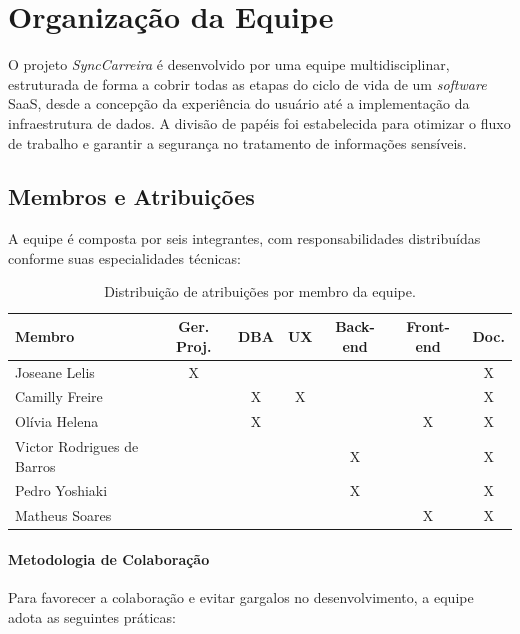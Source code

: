 \section{Organização da Equipe}

O projeto \textit{SyncCarreira} é desenvolvido por uma equipe multidisciplinar, estruturada de forma a cobrir todas as etapas do ciclo de vida de um \textit{software} SaaS, desde a concepção da experiência do usuário até a implementação da infraestrutura de dados. A divisão de papéis foi estabelecida para otimizar o fluxo de trabalho e garantir a segurança no tratamento de informações sensíveis.

\subsection{Membros e Atribuições}

A equipe é composta por seis integrantes, com responsabilidades distribuídas conforme suas especialidades técnicas:

\begin{table}[htb]
\ABNTEXfontereduzida
\caption[Distribuição de Atribuições por Membro]{Distribuição de atribuições por membro da equipe.}
\label{tab-atribuicoes}
\begin{tabular}{|l|c|c|c|c|c|c|}
\hline
\textbf{Membro} & \textbf{Ger. Proj.} & \textbf{DBA} & \textbf{UX} & \textbf{Back-end} & \textbf{Front-end} & \textbf{Doc.} \\
\hline
Joseane Lelis  & X &   &   &   &   & X \\
\hline
Camilly Freire &   & X & X &   &   & X \\
\hline
Olívia Helena  &   & X &   &   & X & X \\
\hline
Victor Rodrigues de Barros &  &  &   & X &   & X \\
\hline
Pedro Yoshiaki &   &   &   & X &   & X \\
\hline
Matheus Soares &   &   &   &   & X & X \\
\hline
\end{tabular}
\end{table}

\paragraph{Metodologia de Colaboração}

Para favorecer a colaboração e evitar gargalos no desenvolvimento, a equipe adota as seguintes práticas:

